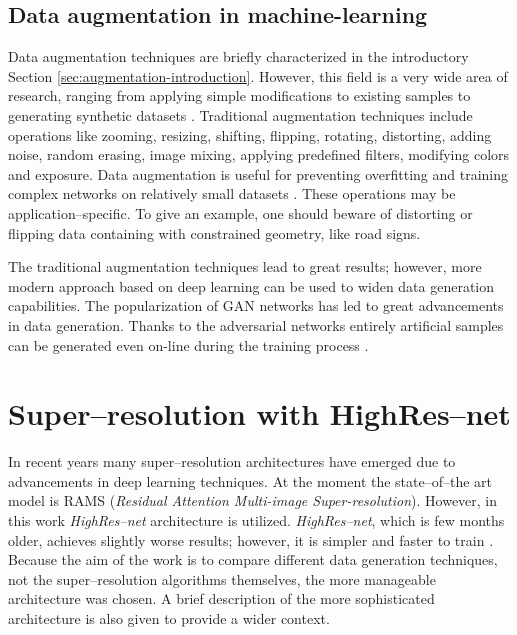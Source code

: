 \subsection{Data augmentation in machine-learning}
Data augmentation techniques are briefly characterized in the introductory Section \ref{sec:augmentation-introduction}.
However, this field is a very wide area of research, ranging from applying simple modifications to existing samples to generating synthetic datasets \cite{kar-2019-synthetic}.
Traditional augmentation techniques include operations like zooming, resizing, shifting, flipping, rotating, distorting, adding noise, random erasing, image mixing, applying predefined filters, modifying colors and exposure.
Data augmentation is useful for preventing overfitting and training complex networks on relatively small datasets \cite{shorten-2019-augmentation}.
These operations may be application--specific.
To give an example, one should beware of distorting or flipping data containing with constrained geometry, like road signs.

The traditional augmentation techniques lead to great results; however, more modern approach based on deep learning can be used to widen data generation capabilities.
The popularization of GAN networks has led to great advancements in data generation.
Thanks to the adversarial networks entirely artificial samples can be generated \cite{sundaram-2021-gangen} even on-line during the training process \cite{bulat-2018-supergan}.

\section{Super--resolution with HighRes--net}
In recent years many super--resolution architectures have emerged due to advancements in deep learning techniques.
At the moment the state--of--the art model is RAMS (\textit{Residual Attention Multi-image Super-resolution}).
However, in this work \textit{HighRes--net} architecture is utilized.
\textit{HighRes--net}, which is few months older, achieves slightly worse results; however, it is simpler and faster to train \cite{paperswithcode-ranking}.
Because the aim of the work is to compare different data generation techniques, not the super--resolution algorithms themselves, the more manageable architecture was chosen.
A brief description of the more sophisticated architecture is also given to provide a wider context.

